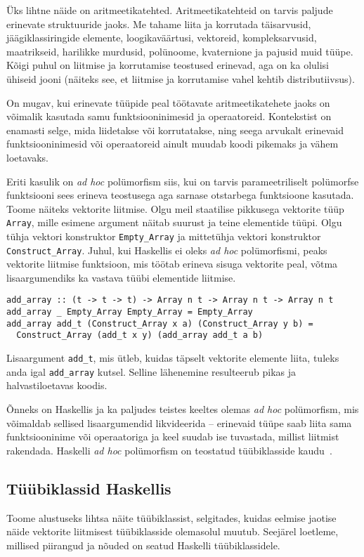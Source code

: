 \documentclass[12pt]{article}
\begin{document}
      Üks lihtne näide on aritmeetikatehted. Aritmeetikatehteid on tarvis paljude erinevate struktuuride jaoks. Me tahame liita ja korrutada täisarvusid, jäägiklassiringide elemente, loogikaväärtusi, vektoreid, kompleksarvusid, maatrikseid, harilikke murdusid, polünoome, kvaternione ja pajusid muid tüüpe. Kõigi puhul on liitmise ja korrutamise teostused erinevad, aga on ka olulisi ühiseid jooni (näiteks see, et liitmise ja korrutamise vahel kehtib distributiivsus).

      On mugav, kui erinevate tüüpide peal töötavate aritmeetikatehete jaoks on võimalik kasutada samu funktsiooninimesid ja operaatoreid. Kontekstist on enamasti selge, mida liidetakse või korrutatakse, ning seega arvukalt erinevaid funktsiooninimesid või operaatoreid ainult muudab koodi pikemaks ja vähem loetavaks.

      Eriti kasulik on \textit{ad hoc} polümorfism siis, kui on tarvis parameetriliselt polümorfse funktsiooni sees erineva teostusega aga sarnase otstarbega funktsioone kasutada. Toome näiteks vektorite liitmise. Olgu meil staatilise pikkusega vektorite tüüp \verb!Array!, mille esimene argument näitab suurust ja teine elementide tüüpi. Olgu tühja vektori konstruktor \verb!Empty_Array! ja mittetühja vektori konstruktor \verb!Construct_Array!. Juhul, kui Haskellis ei oleks \textit{ad hoc} polümorfismi, peaks vektorite liitmise funktsioon, mis töötab erineva sisuga vektorite peal, võtma lisaargumendiks ka vastava tüübi elementide liitmise.

      \begin{verbatim}add_array :: (t -> t -> t) -> Array n t -> Array n t -> Array n t
add_array _ Empty_Array Empty_Array = Empty_Array
add_array add_t (Construct_Array x a) (Construct_Array y b) =
  Construct_Array (add_t x y) (add_array add_t a b)\end{verbatim}

    Lisaargument \verb!add_t!, mis ütleb, kuidas täpselt vektorite elemente liita, tuleks anda igal \verb!add_array! kutsel. Selline lähenemine resulteerub pikas ja halvastiloetavas koodis.

    Õnneks on Haskellis ja ka paljudes teistes keeltes olemas \textit{ad hoc} polümorfism, mis võimaldab sellised lisaargumendid likvideerida -- erinevaid tüüpe saab liita sama funktsiooninime või operaatoriga ja keel suudab ise tuvastada, millist liitmist rakendada. Haskelli \textit{ad hoc} polümorfism on teostatud tüübiklasside kaudu~\cite{How}.
    \subsection{Tüübiklassid Haskellis}\label{haskklass}
      Toome alustuseks lihtsa näite tüübiklassist, selgitades, kuidas eelmise jaotise näide vektorite liitmisest tüübiklasside olemasolul muutub. Seejärel loetleme, millised piirangud ja nõuded on seatud Haskelli tüübiklassidele.
\end{document}
